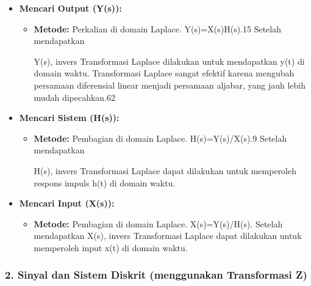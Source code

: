 \documentclass[
  letterpaper,
  DIV=11,
  numbers=noendperiod]{scrreprt}
\providecommand{\tightlist}{%
  \setlength{\itemsep}{0pt}\setlength{\parskip}{0pt}}\usepackage{longtable,booktabs,array}
\begin{document}
\begin{itemize}
\item
  \textbf{Mencari Output (Y(s)):}

  \begin{itemize}
  \item
    \textbf{Metode:} Perkalian di domain Laplace. Y(s)=X(s)H(s).15
    Setelah mendapatkan

    Y(s), invers Transformasi Laplace dilakukan untuk mendapatkan y(t)
    di domain waktu. Transformasi Laplace sangat efektif karena mengubah
    persamaan diferensial linear menjadi persamaan aljabar, yang jauh
    lebih mudah dipecahkan.62
  \end{itemize}
\item
  \textbf{Mencari Sistem (H(s)):}

  \begin{itemize}
  \item
    \textbf{Metode:} Pembagian di domain Laplace. H(s)=Y(s)/X(s).9
    Setelah mendapatkan

    H(s), invers Transformasi Laplace dapat dilakukan untuk memperoleh
    respons impuls h(t) di domain waktu.
  \end{itemize}
\item
  \textbf{Mencari Input (X(s)):}

  \begin{itemize}
  \tightlist
  \item
    \textbf{Metode:} Pembagian di domain Laplace. X(s)=Y(s)/H(s).
    Setelah mendapatkan X(s), invers Transformasi Laplace dapat
    dilakukan untuk memperoleh input x(t) di domain waktu.
  \end{itemize}
\end{itemize}

\subsubsection{2. Sinyal dan Sistem Diskrit (menggunakan Transformasi
Z)}\label{sinyal-dan-sistem-diskrit-menggunakan-transformasi-z}
\end{document}
